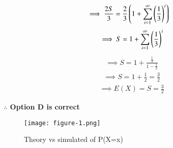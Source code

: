 \documentclass[journal,12pt,twocolumn]{IEEEtran}
\begin{document}
  \begin{align}
     \implies \frac{2S}{3}&=\frac{2}{3}\left(
     1+\sum_{i=1}^{\infty}\left(\frac{1}{3}\right)^{i}\right)
  \end{align}
  \begin{align}
     \implies S=1+\sum_{i=1}^{\infty}\left(\frac{1}{3}\right)^{i}
  \end{align}
  \begin{align}
     \implies S=1+\frac{\frac{1}{3}}{1-\frac{1}{3}}
  \end{align}
  \begin{align}
     \implies S=1+\frac{1}{2}=\frac{3}{2}
  \end{align}
  \begin{align}
     \implies E(X)=S=\frac{3}{2}
  \end{align}
  \begin{center}
  \textbf{$\therefore$ Option D is correct}    
  \end{center}
\begin{figure}[h]
    \begin{center}
    \texttt{[image: figure-1.png]}
    \end{center}
    \caption{Theory vs simulated of P(X=x)}
    \label{fig:1}
\end{figure}
\end{document}
